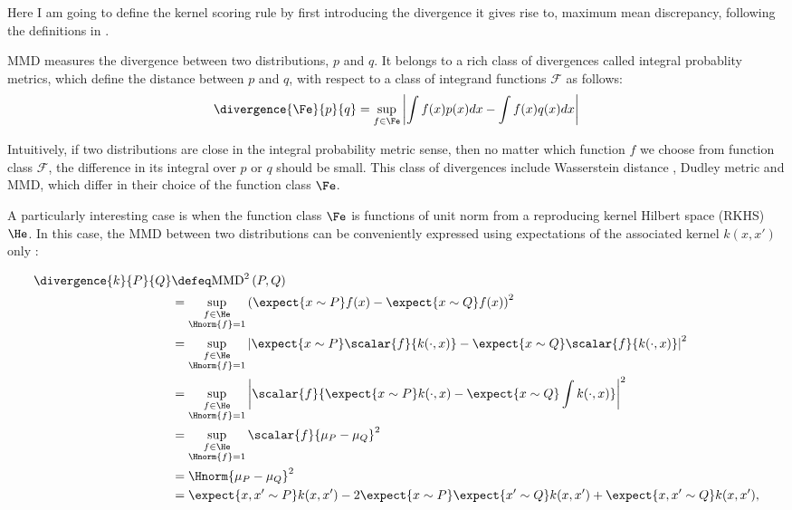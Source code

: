 Here I am going to define the kernel scoring rule by first introducing the divergence it gives rise to, maximum mean discrepancy, following the definitions in \cite{twosample}.

MMD measures the divergence between two distributions, $p$ and $q$. It belongs to a rich class of divergences called integral probablity metrics\cite{http://arxiv.org/pdf/0901.2698.pdf}, which define the distance between  $p$ and $q$, with respect to a class of integrand functions $\mathcal{F}$ as follows:
%
\begin{align}
	\divergence{\Fe}{p}{q} = \sup_{f\in\Fe}\left\vert\int f(x) p(x) dx - \int f(x) q(x) dx \right\vert
\end{align}
	
Intuitively, if two distributions are close in the integral probability metric sense, then no matter which function $f$ we choose from function class $\mathcal{F}$, the difference in its integral over $p$ or $q$ should be small. This class of divergences include Wasserstein distance \cite{}, Dudley metric \cite{} and MMD, which differ in their choice of the function class $\Fe$.

A particularly interesting case is when the function class $\Fe$ is functions of unit norm from a reproducing kernel Hilbert space (RKHS) $\He$. In this case, the MMD between two distributions can be conveniently expressed using expectations of the associated kernel $k(x, x')$ only \cite{Sriperumbudur2010}:


\begin{align}
\divergence{k}{P}{Q} &\defeq \mbox{MMD}^2\left(P,Q\right)\\
	&= \sup_{\substack{f\in\He\\\Hnorm{f}=1}}\left( \expect{x\sim P} f(x) - \expect{x\sim Q} f(x) \right)^2\label{eqn:rkhs-mmd}\\
	&=  \sup_{\substack{f\in\He\\\Hnorm{f}=1}}\left\vert \expect{x\sim P}\scalar{f}{k(\cdot,x)} - \expect{x\sim Q} \scalar{f}{k(\cdot,x)} \right\vert^2\\
	&=  \sup_{\substack{f\in\He\\\Hnorm{f}=1}}\left\vert \scalar{f}{\expect{x\sim P} k(\cdot,x) - \expect{x\sim Q}\int k(\cdot,x)}\right\vert^2\\
	&=  \sup_{\substack{f\in\He\\\Hnorm{f}=1}}\scalar{f}{\mu_{P} - \mu_{Q}}^2\\
	&=  \Hnorm{\mu_{P} - \mu_{Q}}^2\\
	&=  \expect{x,x'\sim P} k(x,x')	- 2 \expect{x\sim P}\expect{x'\sim Q} k(x,x') + \expect{x,x'\sim Q} k(x,x'),\label{eqn:rkhs-mmd-lastline}
\end{align}

